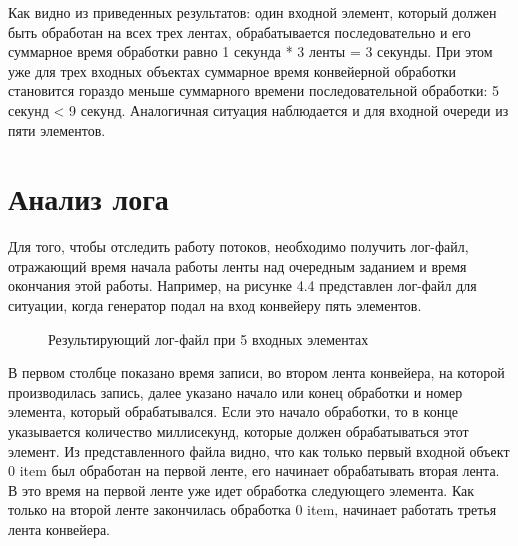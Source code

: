 \documentclass[a4paper,12pt]{report}
\begin{document}
Как видно из приведенных результатов: один входной элемент, который должен быть обработан на всех трех лентах, обрабатывается последовательно и его суммарное время обработки равно 1 секунда * 3 ленты = 3 секунды. При этом уже для трех входных объектах суммарное время конвейерной обработки становится гораздо меньше суммарного времени последовательной обработки: 5 секунд < 9 секунд. Аналогичная ситуация наблюдается и для входной очереди из пяти элементов.

\section{Анализ лога}

\hspace{0.6cm}Для того, чтобы отследить работу потоков, необходимо получить лог-файл, отражающий время начала работы ленты над очередным заданием и время окончания этой работы. 
Например, на рисунке 4.4 представлен лог-файл для ситуации, когда генератор подал на вход конвейеру пять элементов.

\begin{figure}[ht!]
\caption{Результирующий лог-файл при 5 входных элементах}
\end{figure}

\hspace{0.6cm}В первом столбце показано время записи, во втором лента конвейера, на которой производилась запись, далее указано начало или конец обработки и номер элемента, который обрабатывался. Если это начало обработки, то в конце указывается количество миллисекунд, которые должен обрабатываться этот элемент. Из представленного файла видно, что как только первый входной объект 0 item был обработан на первой ленте, его начинает обрабатывать вторая лента. В это время на первой ленте уже идет обработка следующего элемента. Как только на второй ленте закончилась обработка 0 item, начинает работать третья лента конвейера. 
\end{document}

